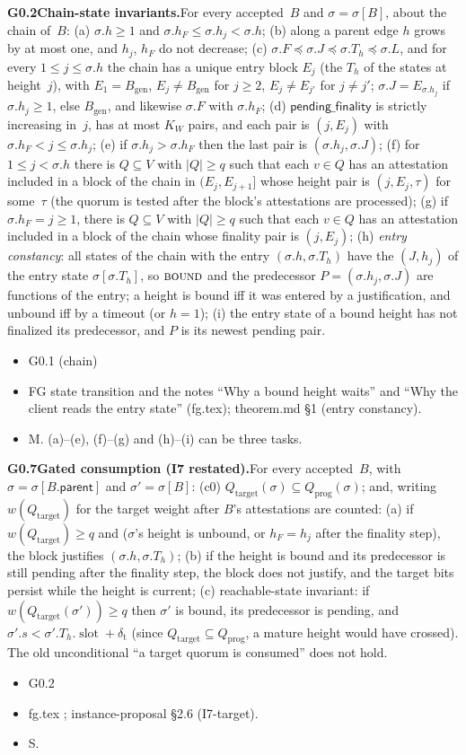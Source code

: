 \documentclass{article}
\newcommand{\genesis}{B_{\mathrm{gen}}}
\newcommand{\slot}{\operatorname{slot}}
\newcommand{\parent}{\mathsf{parent}}
\newcommand{\fname}[1]{\text{\textsc{#1}}}
\newcommand{\pendingFinality}{\mathsf{pending\_finality}}
\newcommand{\Qtarget}{Q_{\mathrm{target}}}
\newcommand{\Qprog}{Q_{\mathrm{prog}}}
\newcommand{\dagnode}[6]{%
\par\medskip\noindent\textbf{#1\enspace #2.}\enspace #3
\begin{itemize}[leftmargin=2.2em,itemsep=0pt,topsep=2pt]
\item[\emph{Uses}] #4
\item[\emph{Evid.}] #5
\item[\emph{Task}] #6
\end{itemize}}
\begin{document}
\dagnode{G0.2}{Chain-state invariants}{For every accepted~$B$ and
$\sigma=\sigma[B]$, about the chain of~$B$:
(a) $\sigma.h\geq1$ and $\sigma.h_F\leq\sigma.h_j<\sigma.h$;
(b) along a parent edge $h$ grows by at most one, and $h_j$, $h_F$ do not
decrease;
(c) $\sigma.F\preceq\sigma.J\preceq\sigma.T_h\preceq\sigma.L$, and for every
$1\leq j\leq\sigma.h$ the chain has a unique entry block $E_j$ (the $T_h$ of
the states at height~$j$), with $E_1=\genesis$, $E_j\neq\genesis$ for
$j\geq2$, $E_j\neq E_{j'}$ for $j\neq j'$; $\sigma.J=E_{\sigma.h_j}$ if
$\sigma.h_j\geq1$, else $\genesis$, and likewise $\sigma.F$ with $\sigma.h_F$;
(d) $\pendingFinality$ is strictly increasing in~$j$, has at most $K_W$
pairs, and each pair is $(j,E_j)$ with $\sigma.h_F<j\leq\sigma.h_j$;
(e) if $\sigma.h_j>\sigma.h_F$ then the last pair is $(\sigma.h_j,\sigma.J)$;
(f) for $1\leq j<\sigma.h$ there is $Q\subseteq V$ with $|Q|\geq q$ such that
each $v\in Q$ has an attestation included in a block of the chain in
$(E_j,E_{j+1}]$ whose height pair is $(j,E_j,\tau)$ for some~$\tau$ (the quorum
is tested after the block's attestations are processed);
(g) if $\sigma.h_F=j\geq1$, there is $Q\subseteq V$ with $|Q|\geq q$ such that
each $v\in Q$ has an attestation included in a block of the chain whose
finality pair is $(j,E_j)$;
(h) \emph{entry constancy}: all states of the chain with the entry
$(\sigma.h,\sigma.T_h)$ have the $(J,h_j)$ of the entry state
$\sigma[\sigma.T_h]$, so $\fname{bound}$ and the predecessor
$P=(\sigma.h_j,\sigma.J)$ are functions of the entry; a height is bound iff
it was entered by a justification, and unbound iff by a timeout (or $h=1$);
(i) the entry state of a bound height has not finalized its predecessor, and
$P$ is its newest pending pair.}
{G0.1 (chain)}{FG state transition and the notes ``Why a bound height waits'' and
``Why the client reads the entry state'' (fg.tex); theorem.md \S1 (entry
constancy).}{M.  (a)--(e), (f)--(g) and (h)--(i) can be three tasks.}

\dagnode{G0.7}{Gated consumption (I7 restated)}{For every accepted~$B$,
with $\sigma=\sigma[B.\parent]$ and $\sigma'=\sigma[B]$: (c0)
$\Qtarget(\sigma)\subseteq\Qprog(\sigma)$; and, writing $w(\Qtarget)$ for the
target weight after $B$'s attestations are counted:
(a) if $w(\Qtarget)\geq q$ and ($\sigma$'s height is unbound, or $h_F=h_j$
after the finality step), the block justifies $(\sigma.h,\sigma.T_h)$;
(b) if the height is bound and its predecessor is still pending after the
finality step, the block does not justify, and the target bits persist while
the height is current;
(c) reachable-state invariant: if $w(\Qtarget(\sigma'))\geq q$ then
$\sigma'$ is bound, its predecessor is pending, and
$\sigma'.s<\sigma'.T_h.\slot+\delta_{\mathrm t}$ (since
$\Qtarget\subseteq\Qprog$, a mature height would have crossed).  The old
unconditional ``a target quorum is consumed'' does not hold.}
{G0.2}{fg.tex \fname{process\_height\_events}; instance-proposal \S2.6
(I7-target).}{S.}
\end{document}
